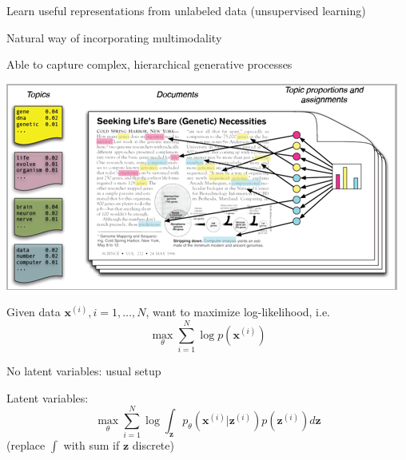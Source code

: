 \documentclass{beamer}
\let\tempone\itemize
\let\temptwo\enditemize
\renewenvironment{itemize}{\tempone\addtolength{\itemsep}{0.5\baselineskip}}{\temptwo}
\newcommand{\zvec}{\mathbf{z}}
\newcommand{\xvec}{\mathbf{x}}
\begin{document}
\begin{frame}
  \begin{center}
   \end{center}
\begin{itemize}
\item Learn useful representations from unlabeled data (unsupervised learning)
\item Natural way of incorporating multimodality
\item Able to capture complex, hierarchical generative processes
\end{itemize}
\end{frame}

\begin{frame}
  \begin{center}
   \end{center}
   \center
\includegraphics[scale=0.5]{img/lda}
\end{frame}

\begin{frame}
  \begin{center}
   \end{center}
 Given data $\xvec^{(i)}, i = 1, \dots, N$, want to maximize log-likelihood, i.e.
 \[ \max_\theta \sum_{i=1}^N \log p(\xvec^{(i)})\]
\begin{itemize}
\item No latent variables: usual setup
\item Latent variables:
\[ \max_\theta \sum_{i=1}^N \log \int_\zvec p_\theta(\xvec^{(i)} | \zvec^{(i)})p(\zvec^{(i)}) d\zvec \]
(replace $\int$ with sum if $\zvec$ discrete)
\end{itemize}
\end{frame}
\end{document}
